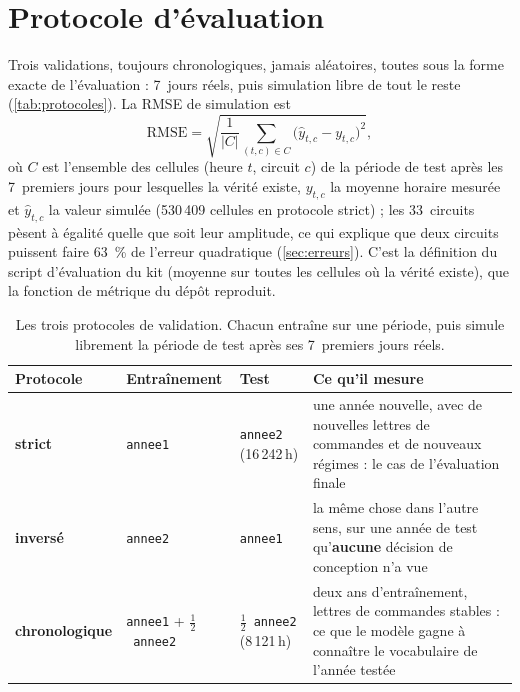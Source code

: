 \documentclass[11pt,a4paper]{article}
\begin{document}
\section{Protocole d'évaluation}\label{sec:protocole}

Trois validations, toujours chronologiques, jamais aléatoires, toutes sous la forme exacte de l'évaluation : 7~jours réels, puis simulation libre de tout le reste (\autoref{tab:protocoles}). La RMSE de simulation est
\begin{equation}\label{eq:rmse}
  \mathrm{RMSE} = \sqrt{\frac{1}{\lvert C\rvert}\sum_{(t,c)\in C}\bigl(\hat{y}_{t,c}-y_{t,c}\bigr)^2},
\end{equation}
où $C$ est l'ensemble des cellules (heure $t$, circuit $c$) de la période de test après les 7~premiers jours pour lesquelles la vérité existe, $y_{t,c}$ la moyenne horaire mesurée et $\hat{y}_{t,c}$ la valeur simulée (530\,409 cellules en protocole strict) ; les 33~circuits pèsent à égalité quelle que soit leur amplitude, ce qui explique que deux circuits puissent faire 63~\% de l'erreur quadratique (\autoref{sec:erreurs}). C'est la définition du script d'évaluation du kit (moyenne sur toutes les cellules où la vérité existe), que la fonction de métrique du dépôt reproduit.

\begin{table}[htbp]
\centering\small
\caption{Les trois protocoles de validation. Chacun entraîne sur une période, puis simule librement la période de test après ses 7~premiers jours réels.}
\label{tab:protocoles}
\begin{tabularx}{\textwidth}{l l l Y}
\toprule
Protocole & Entraînement & Test & Ce qu'il mesure \\
\midrule
\textbf{strict} & \texttt{annee1} & \texttt{annee2} (16\,242\,h) & une année nouvelle, avec de nouvelles lettres de commandes et de nouveaux régimes : le cas de l'évaluation finale \\
\textbf{inversé} & \texttt{annee2} & \texttt{annee1} & la même chose dans l'autre sens, sur une année de test qu'\textbf{aucune} décision de conception n'a vue \\
\textbf{chronologique} & \texttt{annee1} + $\tfrac{1}{2}$~\texttt{annee2} & $\tfrac{1}{2}$~\texttt{annee2} (8\,121\,h) & deux ans d'entraînement, lettres de commandes stables : ce que le modèle gagne à connaître le vocabulaire de l'année testée \\
\bottomrule
\end{tabularx}
\end{table}
\end{document}
